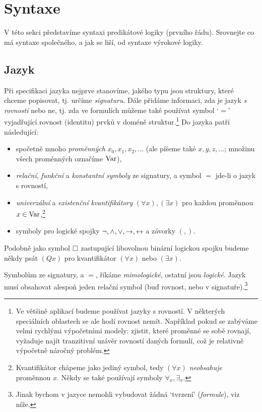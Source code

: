 \section{Syntaxe}

V této sekci představíme syntaxi predikátové logiky (prvního řádu). Srovnejte co má syntaxe společného, a jak se liší, od syntaxe výrokové logiky.


\subsection{Jazyk}

Při specifikaci jazyka nejprve stanovíme, jakého typu jsou struktury, které chceme popisovat, tj. určíme \emph{signaturu}. Dále přidáme informaci, zda je jazyk \emph{s rovností} nebo ne, tj. zda ve formulích můžeme také používat symbol `$=$' vyjadřující rovnost (identitu) prvků v doméně struktur.\footnote{Ve většině aplikací budeme používat jazyky s rovností. V některých speciálních oblastech se ale hodí rovnost nemít. Například pokud se zabýváme velmi rychlými výpočetními modely: zjistit, které proměnné se sobě rovnají, vyžaduje najít tranzitivní uzávěr rovností daných formulí, což je relativně výpočetně náročný problém.} Do jazyka patří následující:
\begin{itemize}
    \item spočetně mnoho \emph{proměnných} $x_0,x_1,x_2,\dots$ (ale píšeme také $x,y,z,\dots$; množinu všech proměnných označíme $\operatorname{Var}$),
    \item \emph{relační}, \emph{funkční} a \emph{konstantní symboly} ze signatury, a symbol $=$ jde-li o jazyk s rovností,
    \item \emph{univerzální} a \emph{existenční} \emph{kvantifikátory} $(\forall x),(\exists x)$ pro každou proměnnou $x\in\operatorname{Var}$,\footnote{Kvantifikátor chápeme jako jediný symbol, tedy $(\forall x)$ \emph{neobsahuje} proměnnou $x$. Někdy se také používají symboly $\forall_x,\exists_x$.}
    \item symboly pro logické spojky \( \neg,{\land},{\lor}, {\mathbin{\rightarrow}}, {\mathbin{\leftrightarrow}} \) a závorky \( (,) \).
\end{itemize}
Podobně jako symbol ${\mathbin{\square}}$ zastupující libovolnou binární logickou spojku budeme někdy psát $(Qx)$ pro kvantifikátor $(\forall x)$ nebo $(\exists x)$.

Symbolům ze signatury, a $=$, říkáme \emph{mimologické}, ostatní jsou \emph{logické}. Jazyk musí obsahovat alespoň jeden relační symbol (buď rovnost, nebo v signatuře).\footnote{Jinak bychom v jazyce nemohli vybudovat žádná `tvrzení' (\emph{formule}), viz níže.}

